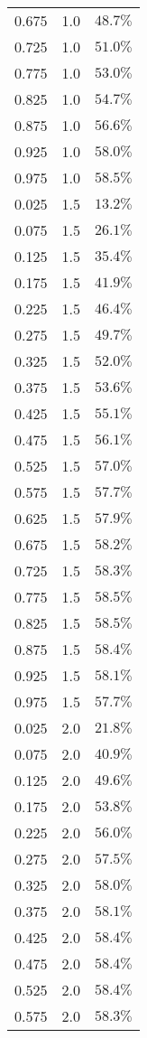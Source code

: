 \begin{longtable}{rrr}
0.675 & 1.0 & $48.7\%$ \\ 
0.725 & 1.0 & $51.0\%$ \\ 
0.775 & 1.0 & $53.0\%$ \\ 
0.825 & 1.0 & $54.7\%$ \\ 
0.875 & 1.0 & $56.6\%$ \\ 
0.925 & 1.0 & $58.0\%$ \\ 
0.975 & 1.0 & $58.5\%$ \\ 
0.025 & 1.5 & $13.2\%$ \\ 
0.075 & 1.5 & $26.1\%$ \\ 
0.125 & 1.5 & $35.4\%$ \\ 
0.175 & 1.5 & $41.9\%$ \\ 
0.225 & 1.5 & $46.4\%$ \\ 
0.275 & 1.5 & $49.7\%$ \\ 
0.325 & 1.5 & $52.0\%$ \\ 
0.375 & 1.5 & $53.6\%$ \\ 
0.425 & 1.5 & $55.1\%$ \\ 
0.475 & 1.5 & $56.1\%$ \\ 
0.525 & 1.5 & $57.0\%$ \\ 
0.575 & 1.5 & $57.7\%$ \\ 
0.625 & 1.5 & $57.9\%$ \\ 
0.675 & 1.5 & $58.2\%$ \\ 
0.725 & 1.5 & $58.3\%$ \\ 
0.775 & 1.5 & $58.5\%$ \\ 
0.825 & 1.5 & $58.5\%$ \\ 
0.875 & 1.5 & $58.4\%$ \\ 
0.925 & 1.5 & $58.1\%$ \\ 
0.975 & 1.5 & $57.7\%$ \\ 
0.025 & 2.0 & $21.8\%$ \\ 
0.075 & 2.0 & $40.9\%$ \\ 
0.125 & 2.0 & $49.6\%$ \\ 
0.175 & 2.0 & $53.8\%$ \\ 
0.225 & 2.0 & $56.0\%$ \\ 
0.275 & 2.0 & $57.5\%$ \\ 
0.325 & 2.0 & $58.0\%$ \\ 
0.375 & 2.0 & $58.1\%$ \\ 
0.425 & 2.0 & $58.4\%$ \\ 
0.475 & 2.0 & $58.4\%$ \\ 
0.525 & 2.0 & $58.4\%$ \\ 
0.575 & 2.0 & $58.3\%$ \\ 

\end{longtable}
